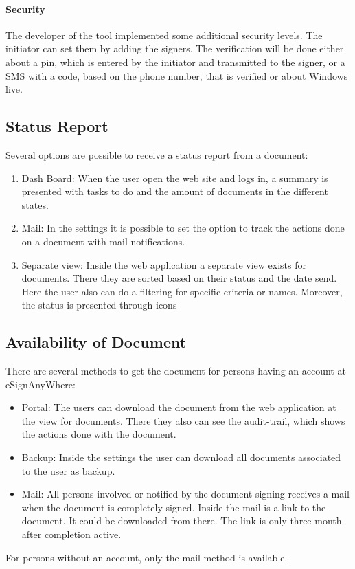 \paragraph{Security}
The developer of the tool implemented some additional security levels. The initiator can set them by adding the signers. The verification will be done either about a pin, which is entered by the initiator and transmitted to the signer, or a SMS with a code, based on the phone number, that is verified or about Windows live.

\subsection{Status Report}
Several options are possible to receive a status report from a document:
\begin{enumerate}
	\item Dash Board: When the user open the web site and logs in, a summary is presented with tasks to do and the amount of documents in the different states.
	\item Mail: In the settings it is possible to set the option to track the actions done on a document with mail notifications.
	\item Separate view: Inside the web application a separate view exists for documents. There they are sorted based on their status and the date send. Here the user also can do a filtering for specific criteria or names. Moreover, the status is presented through icons
\end{enumerate}

\subsection{Availability of Document}
There are several methods to get the document for persons having an account at eSignAnyWhere:
\begin{itemize}
	\item Portal: The users can download the document from the web application at the view for documents. There they also can see the audit-trail, which shows the actions done with the document.
	\item Backup: Inside the settings the user can download all documents associated to the user as backup.
	\item Mail: All persons involved or notified by the document signing receives a mail when the document is completely signed. Inside the mail is a link to the document. It could be downloaded from there. The link is only three month after completion active.  
\end{itemize}
For persons without an account, only the mail method is available.

